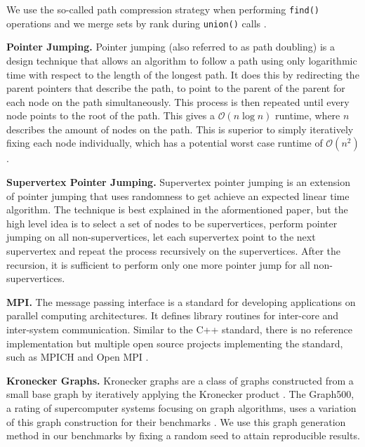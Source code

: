 \documentclass[letterpaper]{article}
\newcommand{\bigoh}{\mathcal O}
\newcommand{\mypar}[1]{{\bf #1.}}
\begin{document}
We use the so-called path compression strategy when performing \verb|find()| operations and we merge sets by rank during
\verb|union()| calls \cite{intro_to_algos}.

\mypar{Pointer Jumping}
Pointer jumping \cite{jeje1992introduction} (also referred to as path doubling) is a design technique that allows an
algorithm to follow a path using only logarithmic time with respect to the length of the longest path. It does this by
redirecting the parent pointers that describe the path, to point to the parent of the parent for each node on the path
simultaneously. This process is then repeated until every node points to the root of the path. This gives a $\bigoh(n
\log n)$ runtime, where $n$ describes the amount of nodes on the path. This is superior to simply iteratively fixing
each node individually, which has a potential worst case runtime of $\bigoh(n^2)$.

\mypar{Supervertex Pointer Jumping}
Supervertex pointer jumping \cite{chung1996parallel} is an extension of pointer jumping that uses randomness to get
achieve an expected linear time algorithm. The technique is best explained in the aformentioned paper, but the high
level idea is to select a set of nodes to be supervertices, perform pointer jumping on all non-supervertices, let each
supervertex point to the next supervertex and repeat the process recursively on the supervertices. After the recursion,
it is sufficient to perform only one more pointer jump for all non-supervertices.

\mypar{MPI}
The message passing interface \cite{clarke1994mpi} is a standard for developing applications on parallel computing
architectures. It defines library routines for inter-core and inter-system communication. Similar to the
C++ standard, there is no reference implementation but multiple open source projects implementing the standard, such as
MPICH and Open MPI \cite{gabriel2004open}.

\mypar{Kronecker Graphs}
Kronecker graphs are a class of graphs constructed from a small base graph by iteratively applying the Kronecker product
\cite{leskovec2010kronecker}. The Graph500, a rating of supercomputer systems focusing on graph algorithms, uses a
variation of this graph construction for their benchmarks \cite{graph500}. We use this graph generation method in our
benchmarks by fixing a random seed to attain reproducible results.
\end{document}
